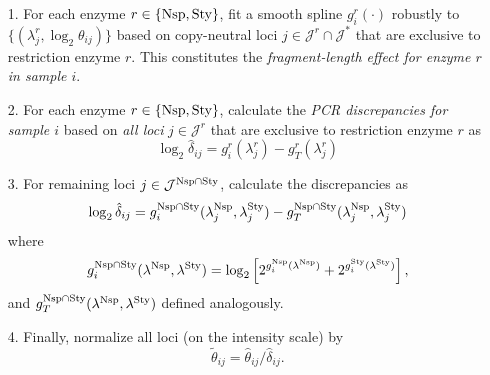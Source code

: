 \documentclass{bioinfo}
\newcommand{\Nsp}{\ensuremath{\textnormal{Nsp}}\xspace}
\newcommand{\Sty}{\ensuremath{\textnormal{Sty}}\xspace}
\begin{document}
\begin{enumerate}
 \item[1.] For each enzyme $r \in \{\Nsp, \Sty\}$, fit a smooth spline $g^{r}_{i}(\cdot)$ robustly to $\{(\lambda^{r}_{j}, \log_2\theta_{ij})\}$ based on copy-neutral loci $j \in \mathcal{J}^{r} \cap \mathcal{J^*}$ that are exclusive to restriction enzyme $r$.  This constitutes the \emph{fragment-length effect for enzyme $r$ in sample $i$}.

 \item[2.] For each enzyme $r \in \{\Nsp, \Sty\}$, calculate the \emph{PCR discrepancies for sample $i$} based on \emph{all loci} $j \in \mathcal{J}^{r}$ that are exclusive to restriction enzyme $r$ as
  \begin{equation}
    \log_2 \hat{\delta}_{ij} 
     = g^{r}_{i}(\lambda^{r}_{j}) - g^{r}_{T}(\lambda^{r}_{j})
    \label{eqnPCRbias}
  \end{equation}

 \item[3.] For remaining loci $j \in \mathcal{J}^{\Nsp\cap\Sty}$, calculate the discrepancies as
  \begin{equation}
    \log_2 \hat{\delta}_{ij} 
     = g^{\Nsp\cap\Sty}_{i}(\lambda^{\Nsp}_{j}, \lambda^{\Sty}_{j}) - g^{\Nsp\cap\Sty}_{T}(\lambda^{\Nsp}_{j}, \lambda^{\Sty}_{j})
    \label{eqnPCRbiasIIIa}
  \end{equation}
  where
  \begin{equation}
    g^{\Nsp\cap\Sty}_{i}(\lambda^{\Nsp}, \lambda^{\Sty}) = \log_2\left[
      2^{g^{\Nsp}_{i}(\lambda^{\Nsp})} + 2^{g^{\Sty}_{i}(\lambda^{\Sty})}
    \right],
    \label{eqnPCRbiasIIIb}
  \end{equation}
  and $g^{\Nsp\cap\Sty}_{T}(\lambda^{\Nsp}, \lambda^{\Sty})$ defined analogously.


 \item[4.] Finally, normalize all loci (on the intensity scale) by
  \begin{equation}
    \tilde{\theta}_{ij} = \hat\theta_{ij} / \hat{\delta}_{ij}.
    \label{eqnPCRnorm}
  \end{equation}
\end{enumerate}

\end{document}
